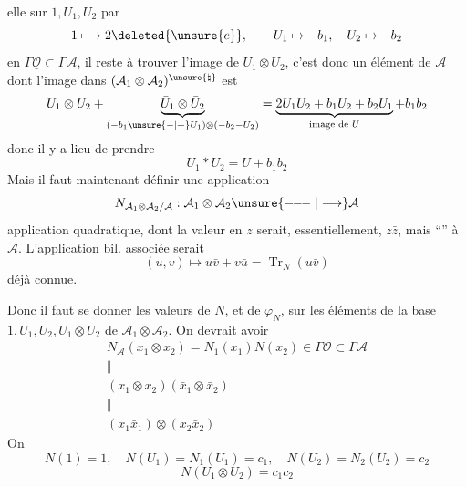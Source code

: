 elle  sur $1,U_1,U_2$ par
\[
1\longmapsto2\deleted{\unsure{e}},\qquad U_1\mapsto-b_1,\quad U_2\mapsto-b_2
\]
 en $\Gamma\underline{\mathcal O}\subset\Gamma\mathcal A$, il reste à trouver l'image de $U_1\otimes U_2$, c'est donc un élément de $\mathcal A$ dont l'image dans $(\mathcal A_1\otimes\mathcal A_2)^{\unsure{\natural}}$ est
\[
U_1\otimes U_2+\underbrace{\bar U_1\otimes\bar U_2}_{(-b_1\unsure{-|+}U_1)\otimes(-b_2-U_2)}=\underbrace{2U_1U_2+b_1U_2+b_2U_1}_{\text{image de }U}+b_1b_2
\]
 donc il y a lieu de prendre
\[
U_1*U_2=U+b_1b_2
\]
Mais il faut maintenant définir une application
\[
N_{\mathcal A_1\otimes\mathcal A_2/\mathcal A}:\mathcal A_1\otimes\mathcal A_2\unsure{\mathrel{-\!\!-\!\!-}|\longrightarrow}\mathcal A
\]
application quadratique, dont la valeur en $z$ serait, essentiellement, $z\bar z$, mais ``'' à $\mathcal A$.
L'application bil. associée serait
\[
(u,v)\longmapsto u\bar v+v\bar u=\operatorname{Tr}_N(u\bar v)
\]
déjà connue.

Donc il faut se donner les  valeurs de $N$, et de $\varphi_N$, sur les éléments de la base $1,U_1,U_2,U_1\otimes U_2$ de $\mathcal A_1\otimes\mathcal A_2$. On devrait avoir
\[
\begin{array}{c}
N_{\mathcal A}(x_1\otimes x_2)=N_1(x_1)N(x_2)\in\Gamma\mathcal O\subset\Gamma\mathcal A\\
\Vert\\
(x_1\otimes x_2)(\bar x_1\otimes\bar x_2)\\
\Vert\\
(x_1\bar x_1)\otimes(x_2\bar x_2)
\end{array}
\]
On 
\[
N(1)=1,\quad N(U_1)=N_1(U_1)=c_1,\quad N(U_2)=N_2(U_2)=c_2
\]
\[
N(U_1\otimes U_2)=c_1c_2
\]
